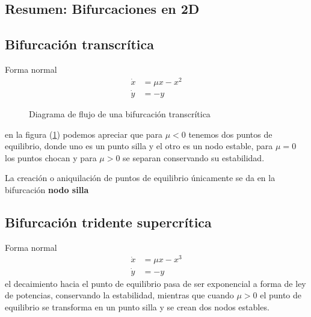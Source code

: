 \subsection{Resumen: Bifurcaciones en 2D}
\subsection*{Bifurcación transcrítica}

Forma normal
	\begin{align*}
	  \dot{x} &= \mu x - x^2 \\
	  \dot{y} &= -y  
	\end{align*}

\begin{figure}
 \centering
		\caption{Diagrama de flujo de una bifurcación transcrítica}
 \label{f:bif trans 2d}
\end{figure}

	en la figura (\ref{f:bif trans 2d}) podemos apreciar que para $\mu<0$ tenemos dos puntos de equilibrio, donde uno es un punto silla y el otro es un nodo estable, para $ \mu=0$ los puntos chocan y para $ \mu>0$ se separan conservando su estabilidad.

	\vspace{2mm}

\begin{tcolorbox}[colback=Black!4, colframe=White, arc=0mm]                                                                       
\begin{nota}
	La creación o aniquilación de puntos de equilibrio únicamente se da en la bifurcación \textbf{nodo silla}
\end{nota}
\end{tcolorbox}                                                                                                                

\subsection*{Bifurcación tridente supercrítica}

Forma normal
\begin{align*}
  \dot{x} &= \mu x - x^3 \\
  \dot{y} &= -y 
\end{align*}
el decaimiento hacia el punto de equilibrio pasa de ser exponencial a forma de ley de potencias, conservando la estabilidad, mientras que cuando $ \mu>0$ el punto de equilibrio se transforma en un punto silla y se crean dos nodos estables.

